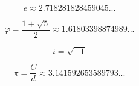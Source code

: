 






\[\begin{equation} e \approx 2.718281828459045... \end{equation}\]

\[\begin{equation} \varphi = \frac{1+\sqrt{5}}{2} \approx 1.61803398874989... \end{equation}\]

\[\begin{equation} i = \sqrt{-1} \end{equation}\]

\[\begin{equation} \pi = \frac{C}{d} \approx 3.141592653589793... \end{equation}\]
